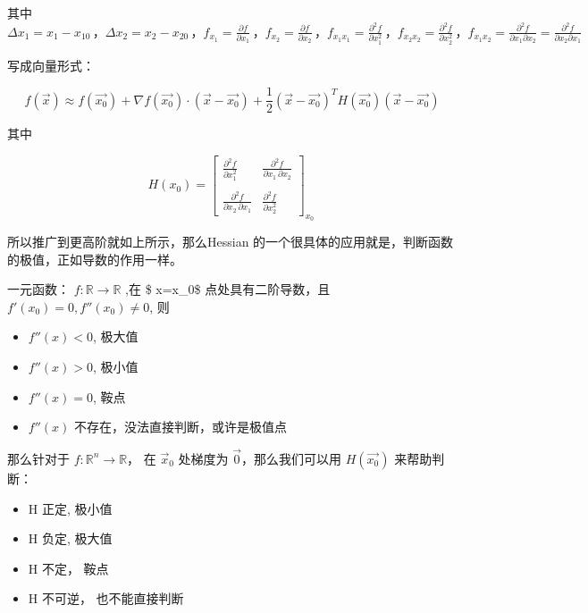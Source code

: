 \documentclass[
]{book}
\providecommand{\tightlist}{%
  \setlength{\itemsep}{0pt}\setlength{\parskip}{0pt}}
\begin{document}
其中 \({\displaystyle \Delta x_{1}=x_{1}-x_{10}\,}，{\displaystyle \Delta x_{2}=x_{2}-x_{20}\,}，{\displaystyle f_{x_{1}}={\frac {\partial f}{\partial x_{1}}}\,}，{\displaystyle f_{x_{2}}={\frac {\partial f}{\partial x_{2}}}\,}，{\displaystyle f_{x_{1}x_{1}}={\frac {\partial ^{2}f}{\partial x_{1}^{2}}}\,}，{\displaystyle f_{x_{2}x_{2}}={\frac {\partial ^{2}f}{\partial x_{2}^{2}}}\,}，{\displaystyle f_{x_{1}x_{2}}={\frac {\partial ^{2}f}{\partial x_{1}\partial x_{2}}}={\frac {\partial ^{2}f}{\partial x_{2}\partial x_{1}}}\,}\)

写成向量形式：

\[f(\vec{x}) \approx f(\vec{x_0}) +   \nabla f(\vec{x_0}) \cdot (\vec{x} - \vec{x_0}) + \frac{1}{2}(\vec{x} - \vec{x_0})^TH(\vec{x_0})(\vec{x} - \vec{x_0})\]

其中

\[
{\displaystyle H(x_{0})={\begin{bmatrix}{\frac {\partial ^{2}f}{\partial x_{1}^{2}}}&{\frac {\partial ^{2}f}{\partial x_{1}\,\partial x_{2}}}\\\\{\frac {\partial ^{2}f}{\partial x_{2}\,\partial x_{1}}}&{\frac {\partial ^{2}f}{\partial x_{2}^{2}}}\end{bmatrix}}_{x_{0}}\,}
\]

所以推广到更高阶就如上所示，那么Hessian 的一个很具体的应用就是，判断函数的极值，正如导数的作用一样。

一元函数： \(f: \mathbb{R} \to \mathbb{R}\) ,在 \$ x=x\_0\$ 点处具有二阶导数，且 \(f'(x_{0})=0, f''(x_{0}) \neq 0\), 则

\begin{itemize}
\tightlist
\item
  \(f''(x) < 0\), 极大值
\item
  \(f''(x) > 0\), 极小值
\item
  \(f''(x) = 0\), 鞍点
\item
  \(f''(x)\) 不存在，没法直接判断，或许是极值点
\end{itemize}

那么针对于 \(f: \mathbb{R}^n \to \mathbb{R}\)， 在 \(\vec{x}_0\) 处梯度为 \(\vec{0}\)，那么我们可以用 \(H(\vec{x_0})\) 来帮助判断：

\begin{itemize}
\tightlist
\item
  H 正定, 极小值
\item
  H 负定, 极大值
\item
  H 不定， 鞍点
\item
  H 不可逆， 也不能直接判断
\end{itemize}
\end{document}
